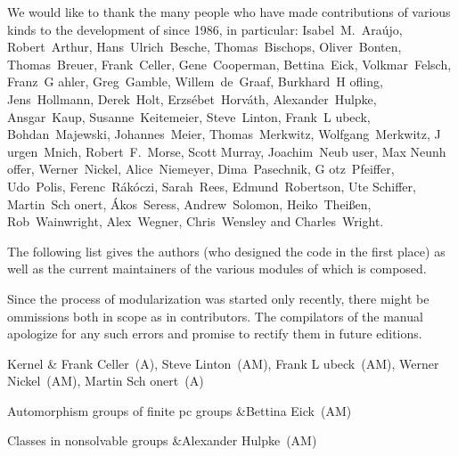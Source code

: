 

{\obeylines%
We would like to thank the many people who have made contributions of
various kinds to the development of {\GAP} since 1986, in particular:
\medskip
Isabel~M.~Ara{\'u}jo, Robert~Arthur, Hans~Ulrich~Besche, Thomas~Bischops,
Oliver~Bonten, Thomas~Breuer, Frank~Celler, Gene~Cooperman, Bettina~Eick,
Volkmar~Felsch, Franz~G{ a}hler, Greg~Gamble, Willem~de~Graaf,
Burkhard~H{ o}fling, Jens~Hollmann, Derek~Holt, Erzs{\'e}bet~Horv{\'a}th, 
Alexander~Hulpke, Ansgar~Kaup, Susanne~Keitemeier, Steve~Linton,
Frank~L{ u}beck, Bohdan~Majewski, Johannes~Meier, Thomas~Merkwitz, 
Wolfgang~Merkwitz, J{ u}rgen~Mnich, Robert~F.~Morse, Scott Murray, 
Joachim~Neub{ u}ser, Max Neunh{ o}ffer, Werner~Nickel, 
Alice~Niemeyer, Dima~Pasechnik, G{ o}tz~Pfeiffer, Udo~Polis,
Ferenc~R{\'a}k{\'o}czi, Sarah~Rees, Edmund~Robertson, Ute Schiffer, 
Martin~Sch{ o}nert, {\'A}kos~Seress, Andrew~Solomon, 
Heiko~Thei{\ss}en, Rob~Wainwright, Alex~Wegner, Chris~Wensley and Charles~Wright.
}%
\bigskip \bigskip \bigskip

The following list gives the authors (who designed the code in the first
place) as well as the current maintainers of the various modules of which
{\GAP} is composed.

Since the process of modularization was started only recently, there might
be ommissions both in scope as in contributors.  The compilators of the
manual apologize for any such errors and promise to rectify them in future
editions.

\beginitems
\item{} Kernel 
& Frank Celler~(A), Steve Linton~(AM), Frank L{ u}beck~(AM), Werner Nickel~(AM), Martin Sch{ o}nert~(A)

\item{} Automorphism groups of finite pc groups 
&Bettina Eick~(AM)

\item{} Classes in nonsolvable groups 
&Alexander Hulpke~(AM)

